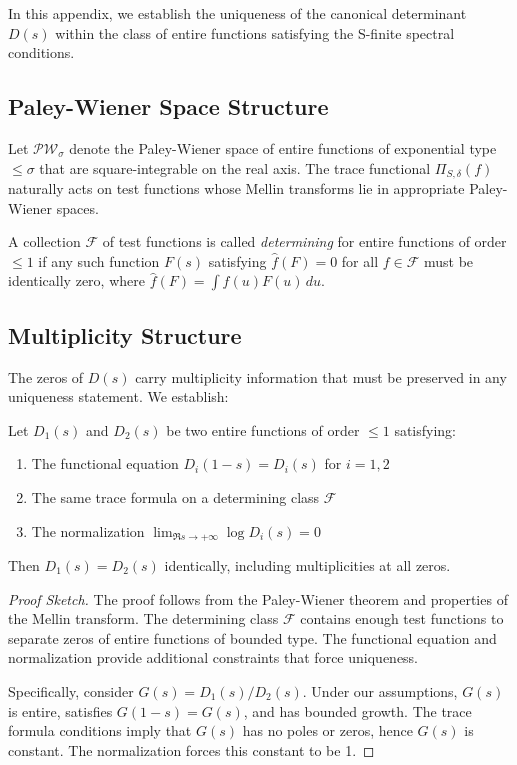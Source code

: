 In this appendix, we establish the uniqueness of the canonical determinant \( D(s) \) within the class of entire functions satisfying the S-finite spectral conditions.

\subsection{Paley-Wiener Space Structure}

Let \( \mathcal{PW}_\sigma \) denote the Paley-Wiener space of entire functions of exponential type \( \leq \sigma \) that are square-integrable on the real axis. The trace functional \( \Pi_{S,\delta}(f) \) naturally acts on test functions whose Mellin transforms lie in appropriate Paley-Wiener spaces.

\begin{definition}
A collection \( \mathcal{F} \) of test functions is called \emph{determining} for entire functions of order \( \leq 1 \) if any such function \( F(s) \) satisfying \( \hat{f}(F) = 0 \) for all \( f \in \mathcal{F} \) must be identically zero, where \( \hat{f}(F) = \int f(u) F(u) \, du \).
\end{definition}

\subsection{Multiplicity Structure}

The zeros of \( D(s) \) carry multiplicity information that must be preserved in any uniqueness statement. We establish:

\begin{theorem}
Let \( D_1(s) \) and \( D_2(s) \) be two entire functions of order \( \leq 1 \) satisfying:
\begin{enumerate}
\item The functional equation \( D_i(1-s) = D_i(s) \) for \( i = 1,2 \)
\item The same trace formula on a determining class \( \mathcal{F} \)
\item The normalization \( \lim_{\Re s \to +\infty} \log D_i(s) = 0 \)
\end{enumerate}
Then \( D_1(s) = D_2(s) \) identically, including multiplicities at all zeros.
\end{theorem}

\begin{proof}[Proof Sketch]
The proof follows from the Paley-Wiener theorem and properties of the Mellin transform. The determining class \( \mathcal{F} \) contains enough test functions to separate zeros of entire functions of bounded type. The functional equation and normalization provide additional constraints that force uniqueness.

Specifically, consider \( G(s) = D_1(s)/D_2(s) \). Under our assumptions, \( G(s) \) is entire, satisfies \( G(1-s) = G(s) \), and has bounded growth. The trace formula conditions imply that \( G(s) \) has no poles or zeros, hence \( G(s) \) is constant. The normalization forces this constant to be 1.
\end{proof}

